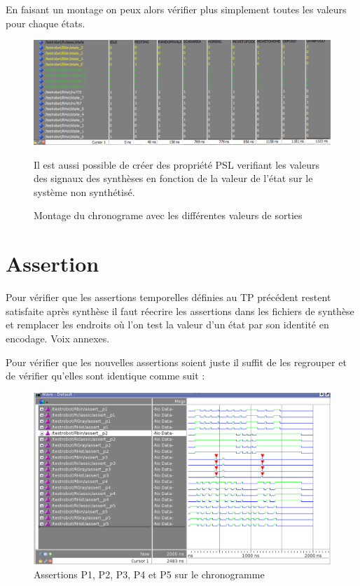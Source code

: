 \documentclass{article}
\begin{document}
En faisant un montage on peux alors vérifier plus simplement toutes les valeurs pour chaque états.

\begin{figure}[!h]
\centering
\includegraphics[scale=0.6]{C/STATE.PNG}
\caption{Montage du chronograme avec les différentes valeurs de sorties }

Il est aussi possible de créer des propriété PSL verifiant les valeurs des signaux des synthèses en fonction de la valeur de l'état sur le système non synthétisé.
\end{figure} 

\section{Assertion}

Pour vérifier que les assertions temporelles définies au TP précédent restent satisfaite après synthèse il faut réecrire les assertions dans les fichiers de synthèse et remplacer les endroits où l'on test la valeur d'un état par son identité en encodage. Voix annexes.

Pour vérifier que les nouvelles assertions soient juste il suffit de les regrouper et de vérifier qu'elles sont identique comme suit :

\begin{figure}[!h]
\centering
\includegraphics[scale=0.6]{D/testFULL.PNG}
\caption{Assertions P1, P2, P3, P4 et P5 sur le chronogramme }
\end{figure}
\end{document}
